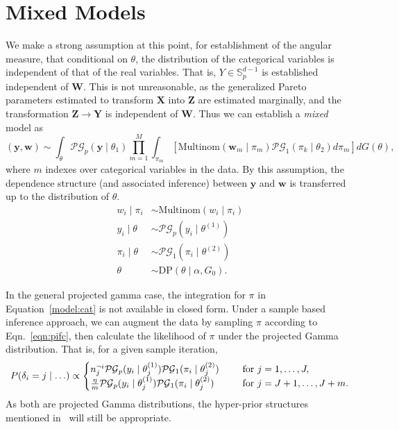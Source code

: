 \section{Mixed Models}
We make a strong assumption at this point, for establishment of the angular measure,
that conditional on $\theta$, the distribution of the categorical variables is independent 
of that of the real variables.  That is, $Y \in {\mathbb S}_{p}^{d-1}$ is established
independent of $\bm{W}$.  This is not unreasonable, as the generalized Pareto parameters 
estimated to transform $\bm{X}$ into $\bm{Z}$ are estimated marginally, and the transformation $\bm{Z}\to\bm{Y}$ is independent of $\bm{W}$.  Thus we can establish a \emph{mixed} model as
\begin{equation}
    \label{model:mixed}
    (\bm{y},\bm{w})\sim \int_{\theta}\mathcal{PG}_{p}(\bm{y}\mid\theta_1)\prod_{m = 1}^M\int_{\pi_m}\left[\text{Multinom}(\bm{w}_m\mid\pi_m)\mathcal{PG}_1(\pi_k\mid\theta_2)d\pi_{m}\right]dG(\theta),
\end{equation}
where $m$ indexes over categorical variables in the data. By this assumption, the dependence 
structure (and associated inference) between $\bm{y}$ and $\bm{w}$ is transferred up to the 
distribution of $\theta$.
\begin{equation*}
    \label{model:mixeddp}
    \begin{aligned}
    w_i\mid \pi_i &\sim \text{Multinom}(w_i\mid \pi_i)\\
    y_i\mid\theta &\sim\mathcal{PG}_p(y_i\mid\theta^{(1)})\\
    \pi_i\mid\theta &\sim \mathcal{PG}_1(\pi_i\mid\theta^{(2)})\\
    \theta &\sim \text{DP}(\theta\mid\alpha, G_0).
    \end{aligned}
\end{equation*}

In the general projected gamma case, the integration for $\pi$ in Equation~\ref{model:cat} is not
  available in closed form.  Under a sample based inference approach, we can augment the data by 
  sampling $\pi$ according to Eqn.~\ref{eqn:pifc}, then calculate the likelihood of $\pi$ under 
  the projected Gamma distribution.  That is, for a given sample iteration,
\begin{equation*}
    \begin{aligned}
    P(\delta_i = j\mid \ldots) \propto \begin{cases} 
    n_j^{\neg i}\mathcal{PG}_p(y_i\mid\theta_j^{(1)})\mathcal{PG}_1(\pi_i\mid\theta_j^{(2)}) \hspace{0.5cm}&\text{for }j = 1,\ldots,J,\\
    \frac{\eta}{m}\mathcal{PG}_p(y_i\mid\theta_j^{(1)})\mathcal{PG}_1(\pi_i\mid\theta_j^{(2)}) \hspace{0.5cm}&\text{for }j = J + 1,\ldots, J + m.\\
    \end{cases}
    \end{aligned}
\end{equation*}
As both are projected Gamma distributions, the hyper-prior structures mentioned 
  in~\cite{trubey:pg} will still be appropriate.

